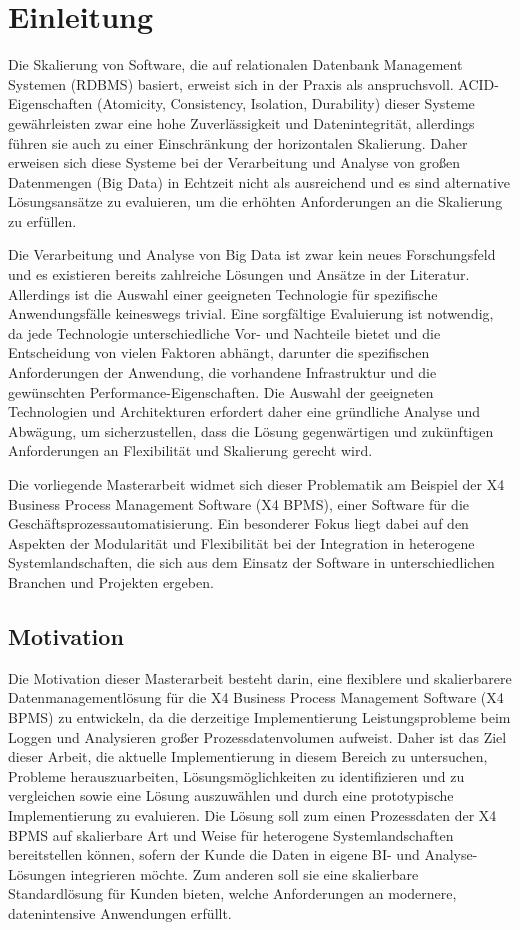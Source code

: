 \chapter{Einleitung}
\label{Einleitung}
Die Skalierung von Software, die auf relationalen Datenbank Management Systemen (RDBMS) basiert, erweist sich in der Praxis als anspruchsvoll. ACID-Eigenschaften (Atomicity, Consistency, Isolation, Durability) dieser Systeme gewährleisten zwar eine hohe Zuverlässigkeit und Datenintegrität, allerdings führen sie auch zu einer Einschränkung der horizontalen Skalierung. \cite{reis2023} Daher erweisen sich diese Systeme bei der Verarbeitung und Analyse von großen Datenmengen (Big Data) in Echtzeit nicht als ausreichend und es sind alternative Lösungsansätze zu evaluieren, um die erhöhten Anforderungen an die Skalierung zu erfüllen.

Die Verarbeitung und Analyse von Big Data ist zwar kein neues Forschungsfeld und es existieren bereits zahlreiche Lösungen und Ansätze in der Literatur. Allerdings ist die Auswahl einer geeigneten Technologie für spezifische Anwendungsfälle keineswegs trivial. Eine sorgfältige Evaluierung ist notwendig, da jede Technologie unterschiedliche Vor- und Nachteile bietet und die Entscheidung von vielen Faktoren abhängt, darunter die spezifischen Anforderungen der Anwendung, die vorhandene Infrastruktur und die gewünschten Performance-Eigenschaften. Die Auswahl der geeigneten Technologien und Architekturen erfordert daher eine gründliche Analyse und Abwägung, um sicherzustellen, dass die Lösung gegenwärtigen und zukünftigen Anforderungen an Flexibilität und Skalierung gerecht wird.

 Die vorliegende Masterarbeit widmet sich dieser Problematik am Beispiel der X4 Business Process Management Software (X4 BPMS), einer Software für die Geschäftsprozessautomatisierung. Ein besonderer Fokus liegt dabei auf den Aspekten der Modularität und Flexibilität bei der Integration in heterogene Systemlandschaften, die sich aus dem Einsatz der Software in unterschiedlichen Branchen und Projekten ergeben. 

\section{Motivation}
Die Motivation dieser Masterarbeit besteht darin, eine flexiblere und skalierbarere Datenmanagementlösung für die X4 Business Process Management Software (X4 BPMS) zu entwickeln, da die derzeitige Implementierung Leistungsprobleme beim Loggen und Analysieren großer Prozessdatenvolumen aufweist. Daher ist das Ziel dieser Arbeit, die aktuelle Implementierung in diesem Bereich zu untersuchen, Probleme herauszuarbeiten, Lösungsmöglichkeiten zu identifizieren und zu vergleichen sowie eine Lösung auszuwählen und durch eine prototypische Implementierung zu evaluieren. Die Lösung soll zum einen Prozessdaten der X4 BPMS auf skalierbare Art und Weise für heterogene Systemlandschaften bereitstellen können, sofern der Kunde die Daten in eigene BI- und Analyse-Lösungen integrieren möchte. Zum anderen soll sie eine skalierbare Standardlösung für Kunden bieten, welche Anforderungen an modernere, datenintensive Anwendungen erfüllt.

